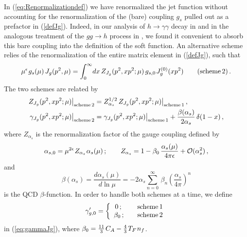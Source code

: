 \documentclass[12pt]{article}
\newcommand{\spac}{{\hspace{0.3mm}}}
\numberwithin{equation}{section}
\begin{document}
In (\ref{eq:Renormalizationdef}) we have renormalized the jet function without accounting for the renormalization of the (bare) coupling $g_s$ pulled out as a prefactor in (\ref{defJg}). Indeed, in our analysis of $h\to\gamma\gamma$ decay in \cite{Liu:2020wbn} and in the analogous treatment of the $gg\to h$ process in \cite{HiggsGluGlu}, we found it convenient to absorb this bare coupling into the definition of the soft function. An alternative scheme relies of the renormalization of the entire matrix element in (\ref{defJg}), such that
\begin{equation}
   \mu^\epsilon\spac g_s(\mu)\,J_g(p^2,\mu) = \int_0^\infty\!dx\,Z_{J_g}(p^2,x p^2;\mu)\,g_{s,0}\spac J_g^{(0)}(x p^2) 
    \qquad \text{(scheme\,2)} \,.
\end{equation}
The two schemes are related by
\begin{equation}\label{relas}
\begin{aligned}
   Z_{J_g}(p^2,x p^2;\mu) \big|_{\rm scheme\,2} 
   &= Z_{\alpha_s}^{1/2}\,Z_{J_g}(p^2,x p^2;\mu) \big|_{\rm scheme\,1} \,, \\
   \gamma_{J_g}(p^2,x p^2;\mu) \big|_{\rm scheme\,2} 
   &= \gamma_{J_g}(p^2,x p^2;\mu) \big|_{\rm scheme\,1} + \frac{\beta(\alpha_s)}{2\alpha_s}\,\delta(1-x) \,,
\end{aligned}
\end{equation}
where $Z_{\alpha_s}$ is the renormalization factor of the gauge coupling defined by
\begin{equation}
   \alpha_{s,0} = \mu^{2\epsilon}\spac Z_{\alpha_s}\spac\alpha_s(\mu) \,; \qquad
   Z_{\alpha_s} = 1 - \beta_0\,\frac{\alpha_s(\mu)}{4\pi\epsilon} + \mathcal{O}(\alpha_s^2) \,,
\end{equation}
and 
\begin{equation}
   \beta(\alpha_s)
   = \frac{d\alpha_s(\mu)}{d\ln\mu}
   = - 2\alpha_s \sum_{n=0}^\infty\,\beta_n \left( \frac{\alpha_s}{4\pi} \right)^n
\end{equation}
is the QCD $\beta$-function. In order to handle both schemes at a time, we define
\begin{equation}\label{gamg0def}
   \gamma_{g,0}' 
   = \left\{ \begin{array}{ll}
    \,0 \,; & \quad\text{scheme\,1} \\
    \beta_0 \,; & \quad\text{scheme\,2}
    \end{array} \right.
\end{equation} 
in (\ref{eq:gammaJg}), where $\beta_0=\frac{11}{3}\spac C_A-\frac{4}{3}\spac T_F\spac n_f$. 
\end{document}

